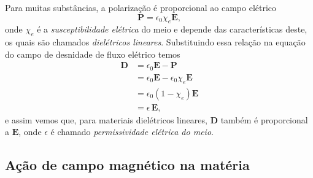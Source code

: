 Para muitas subst\^ancias, a polariza\c{c}\~ao \'e proporcional ao campo el\'etrico
\begin{equation*}
\mathbf{P}=\epsilon_0\chi_e\mathbf{E},
\end{equation*}
onde $\chi_e$ \'e a \textit{susceptibilidade el\'etrica} do meio e depende das caracter\'isticas deste, os quais s\~ao chamados \textit{diel\'etricos lineares}. Substituindo essa rela\c{c}\~ao na equa\c{c}\~ao do campo de desnidade de fluxo el\'etrico temos
\begin{align*}
\mathbf{D}&=\epsilon_0\mathbf{E}-\mathbf{P}\\
&=\epsilon_0\mathbf{E}-\epsilon_0\chi_e\mathbf{E}\\
&=\epsilon_0(1-\chi_e)\mathbf{E}\\
&=\epsilon\,\mathbf{E},
\end{align*}
e assim vemos que, para materiais diel\'etricos lineares, $\mathbf{D}$ tamb\'em \'e proporcional a $\mathbf{E}$, onde $\epsilon$ \'e chamado \textit{permissividade el\'etrica do meio}.

\subsection{A\c{c}\~ao de campo magn\'etico na mat\'eria}

